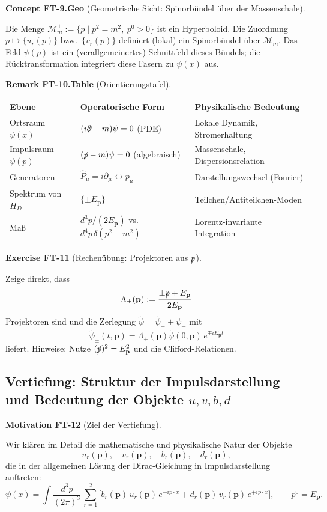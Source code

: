 \documentclass[10pt, letterpaper]{article}
\newcommand{\CustomHeading}[3]{%
  \par\medskip\noindent%
  \textbf{#1 #2} \textnormal{(#3)}.\enskip%
}
\newenvironment{REM}[2]{\begin{unitbox}\CustomHeading{Remark}{#1}{#2}}{\end{unitbox}}
\newenvironment{CONC}[2]{\begin{unitbox}\CustomHeading{Concept}{#1}{#2}}{\end{unitbox}}
\newenvironment{EXE}[2]{\begin{unitbox}\CustomHeading{Exercise}{#1}{#2}}{\end{unitbox}}
\newenvironment{MOT}[2]{\begin{unitbox}\CustomHeading{Motivation}{#1}{#2}}{\end{unitbox}}
\begin{document}
\begin{CONC}{FT-9.Geo}{Geometrische Sicht: Spinorbündel über der Massenschale}
Die Menge $\mathcal M_m^+:=\{p\mid p^2=m^2,\ p^0>0\}$ ist ein Hyperboloid. Die Zuordnung $p\mapsto \{u_r(p)\}$ bzw.\ $\{v_r(p)\}$ definiert (lokal) ein Spinorbündel über $\mathcal M_m^+$. Das Feld $\psi(p)$ ist ein (verallgemeinertes) Schnittfeld dieses Bündels; die Rücktransformation integriert diese Fasern zu $\psi(x)$ aus.
\end{CONC}

\begin{REM}{FT-10.Table}{Orientierungstafel}
\begin{center}
\begin{tabular}{lll}
\hline
Ebene & Operatorische Form & Physikalische Bedeutung\\
\hline
Ortsraum $\psi(x)$ &
$(i\slashed\partial-m)\psi=0$ (PDE) &
Lokale Dynamik, Stromerhaltung\\
Impulsraum $\psi(p)$ &
$(\slashed p-m)\psi=0$ (algebraisch) &
Massenschale, Dispersionsrelation\\
Generatoren &
$\hat P_\mu=i\partial_\mu \leftrightarrow p_\mu$ &
Darstellungswechsel (Fourier)\\
Spektrum von $H_D$ &
$\{\pm E_{\mathbf p}\}$ &
Teilchen/Antiteilchen-Moden\\
Maß &
$d^3p/(2E_{\mathbf p})$ vs.\ $d^4p\,\delta(p^2-m^2)$ &
Lorentz-invariante Integration\\
\hline
\end{tabular}
\end{center}
\end{REM}

\begin{EXE}{FT-11}{Rechenübung: Projektoren aus $\slashed p$}
Zeige direkt, dass 
\[
 \Lambda_\pm(\mathbf p):=\frac{\pm\slashed p + E_{\mathbf p}}{2E_{\mathbf p}}
\]
Projektoren sind und die Zerlegung $\tilde\psi=\tilde\psi_++\tilde\psi_-$ mit
\[
 \tilde\psi_\pm(t,\mathbf p)=\Lambda_\pm(\mathbf p)\tilde\psi(0,\mathbf p)\,e^{\mp iE_{\mathbf p}t}
\]
liefert. Hinweise: Nutze $(\slashed p)^2=E_{\mathbf p}^2$ und die Clifford-Relationen.
\end{EXE}


\subsection{Vertiefung: Struktur der Impulsdarstellung und Bedeutung der Objekte $u,v,b,d$}

\begin{MOT}{FT-12}{Ziel der Vertiefung}
Wir klären im Detail die mathematische und physikalische Natur der Objekte
\[
u_r(\mathbf p),\quad v_r(\mathbf p),\quad b_r(\mathbf p),\quad d_r(\mathbf p),
\]
die in der allgemeinen Lösung der Dirac-Gleichung in Impulsdarstellung auftreten:
\[
\psi(x)=\int\!\frac{d^3p}{(2\pi)^3}\,\sum_{r=1}^2
\Big[b_r(\mathbf p)\,u_r(\mathbf p)\,e^{-ip\cdot x}
+d_r(\mathbf p)\,v_r(\mathbf p)\,e^{+ip\cdot x}\Big],
\qquad p^0=E_{\mathbf p}.
\]
\end{MOT}
\end{document}
